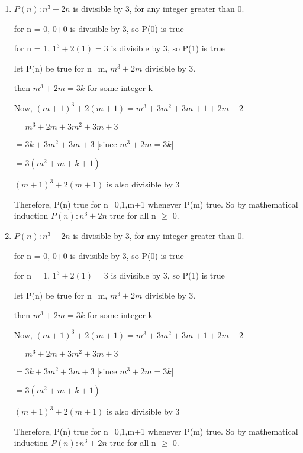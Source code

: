 \documentclass[11pt]{article}
\begin{document}
\begin{enumerate}
 \item
 $P(n): n^3+2n$ is divisible by 3, for any integer greater than 0.
 
 for n = 0, 0+0 is divisible by 3, so P(0) is true
 
 for n = 1, $1^3+2(1) = 3$ is divisible by 3, so P(1) is true
 
 let P(n) be true for n=m, $m^3+2m$ divisible by 3.
 
 then $m^3+2m = 3k$ for some integer k
 
 Now, $(m+1)^3+2(m+1)= m^3+3m^2+3m+1+2m+2$
 
 $=m^3+2m+3m^2+3m+3$
 
 $=3k+3m^2+3m+3$ [since $m^3+2m=3k]$
 
 $=3(m^2+m+k+1)$
 
$(m+1)^3+2(m+1)$ is also divisible by 3

Therefore, P(n) true for n=0,1,m+1 whenever P(m) true. So by mathematical induction $P(n): n^3+2n$ true for all n $\geqslant$ 0.

 \item
 $P(n): n^3+2n$ is divisible by 3, for any integer greater than 0.
 
 for n = 0, 0+0 is divisible by 3, so P(0) is true
 
 for n = 1, $1^3+2(1) = 3$ is divisible by 3, so P(1) is true
 
 let P(n) be true for n=m, $m^3+2m$ divisible by 3.
 
 then $m^3+2m = 3k$ for some integer k
 
 Now, $(m+1)^3+2(m+1)= m^3+3m^2+3m+1+2m+2$
 
 $=m^3+2m+3m^2+3m+3$
 
 $=3k+3m^2+3m+3$ [since $m^3+2m=3k]$
 
 $=3(m^2+m+k+1)$
 
$(m+1)^3+2(m+1)$ is also divisible by 3

Therefore, P(n) true for n=0,1,m+1 whenever P(m) true. So by mathematical induction $P(n): n^3+2n$ true for all n $\geqslant$ 0.



\end{enumerate}
\end{document}
